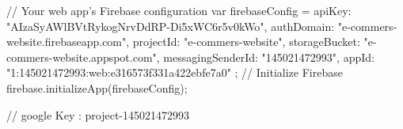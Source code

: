  // Your web app's Firebase configuration
  var firebaseConfig = {
    apiKey: "AIzaSyAWlBVtRykogNrvDdRP-Di5xWC6r5v0kWo",
    authDomain: "e-commers-website.firebaseapp.com",
    projectId: "e-commers-website",
    storageBucket: "e-commers-website.appspot.com",
    messagingSenderId: "145021472993",
    appId: "1:145021472993:web:e316573f331a422ebfe7a0"
  };
  // Initialize Firebase
  firebase.initializeApp(firebaseConfig);



  // google Key : project-145021472993